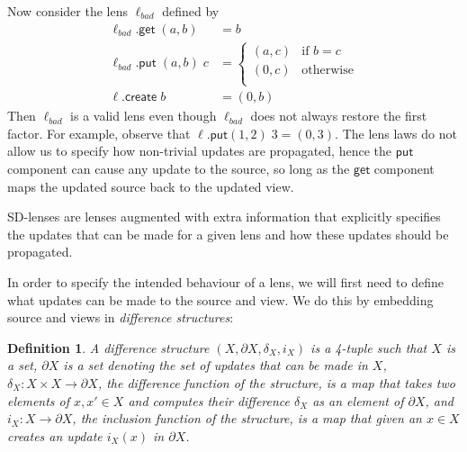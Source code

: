 \documentclass[acmsmall,review,anonymous]{acmart}\settopmatter{printfolios=true,printccs=false,printacmref=false}
\newtheorem{definition}{Definition}
\newcommand{\kw}[1]{\ensuremath{\mathsf{#1}}\xspace}
\newcommand{\get}{\ensuremath{\kw{get}}\xspace}
\newcommand{\pput}{\ensuremath{\kw{put}}\xspace}
\newcommand{\create}{\ensuremath{\kw{create}}\xspace}
\begin{document}
Now consider the lens $\ell_{bad}$ defined by
\begin{align*}
\ell_{bad}.\get \; (a, b) &= b\\
\ell_{bad}.\pput \; (a, b) \; c &= \begin{cases}
(a, c) & \text{if }b = c\\
(0, c) & \text{otherwise}\\
\end{cases}\\
\ell.\create \; b &= (0,b)
\end{align*}
Then $\ell_{bad}$ is a valid lens even though $\ell_{bad}$ does not
always restore the first factor. For example, observe that $\ell.\pput (1, 2) \;
3 = (0,3)$. The lens laws do not allow us to specify how non-trivial updates are
propagated, hence the \pput component can cause any update to the source, so
long as the \get component maps the updated source back to the updated view.

SD-lenses are lenses augmented with extra information that explicitly specifies
the updates that can be made for a given lens and how these updates should be
propagated.

In order to specify the intended behaviour of a lens, we will first need to
define what updates can be made to the source and view. We do this by embedding
source and views in {\em difference structures}:
\begin{definition}
A difference structure $(X, \partial X, \delta_X, i_X)$ is a 4-tuple such that
$X$ is a set, $\partial X$ is a set denoting the set of updates that can be
made in $X$, $\delta_X : X \times X \longrightarrow \partial X$, the {\em
difference function} of the structure, is a map that takes two elements of $x,
x' \in X$ and computes their difference $\delta_X$ as an element of $\partial
X$, and $i_X : X \longrightarrow \partial X$, the {\em inclusion function} of
the structure, is a map that given an $x \in X$ creates an update $i_X(x)$ in
$\partial X$.
\end{definition}
\end{document}
